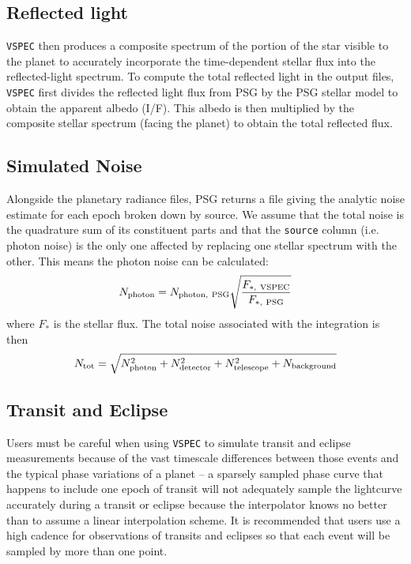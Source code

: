 \documentclass[twocolumn]{aastex631}
\newcommand{\vspec}[1]{\texttt{VSPEC}#1}
\begin{document}
\subsection{Reflected light}
\vspec{} then produces a composite spectrum of the portion of the star visible to the planet to accurately incorporate the time-dependent stellar flux into the reflected-light spectrum. To compute the total reflected light in the output files, \vspec{} first divides the reflected light flux from PSG by the PSG stellar model to obtain the apparent albedo (I/F). This albedo is then multiplied by the composite stellar spectrum (facing the planet) to obtain the total reflected flux.

\subsection{Simulated Noise}
Alongside the planetary radiance files, PSG returns a file giving the analytic noise estimate for each epoch broken down by source. We assume that the total noise is the quadrature sum of its constituent parts and that the \texttt{source} column (i.e. photon noise) is the only one affected by replacing one stellar spectrum with the other. This means the photon noise can be calculated:
\begin{equation}
    N_{\rm photon} = N_{\rm photon,~PSG} \sqrt{\frac{F_{*,\rm ~VSPEC}}{F_{*,\rm ~PSG}}}
\end{equation}
where $F_*$ is the stellar flux. The total noise associated with the integration is then
\begin{equation}
    N_{\rm tot} = \sqrt{
        N_{\rm photon}^2 + N_{\rm detector}^2 + N_{\rm telescope}^2 + N_{\rm background}
    }
\end{equation}

\subsection{Transit and Eclipse}
Users must be careful when using \vspec{} to simulate transit and eclipse measurements because of the vast timescale differences between those events and the typical phase variations of a planet -- a sparsely sampled phase curve that happens to include one epoch of transit will not adequately sample the lightcurve accurately during a transit or eclipse because the interpolator knows no better than to assume a linear interpolation scheme. It is recommended that users use a high cadence for observations of transits and eclipses so that each event will be sampled by more than one point.
\end{document}
